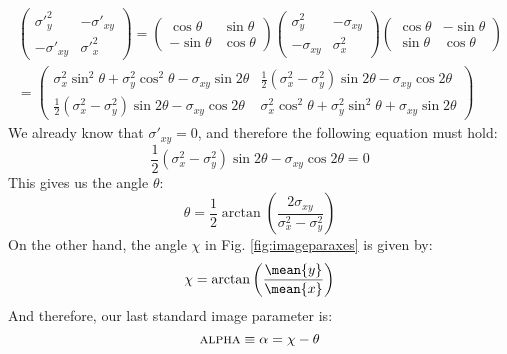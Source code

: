 \begin{multline}
  \label{eq:rotexplicit}
  \begin{pmatrix}
    {\sigma'}_y^2 & -{\sigma'}_{xy} \\ -{\sigma'}_{xy} & {\sigma'}_x^2
  \end{pmatrix}
  =
  \begin{pmatrix}
    \cos\theta & \sin\theta \\ -\sin\theta & \cos\theta
  \end{pmatrix}
  \begin{pmatrix}
    \sigma_y^2 & -\sigma_{xy} \\ -\sigma_{xy} & \sigma_x^2
  \end{pmatrix}
  \begin{pmatrix}
    \cos\theta & -\sin\theta \\ \sin\theta & \cos\theta
  \end{pmatrix} \\
  =
  \begin{pmatrix}
    \sigma_x^2 \sin^2\theta + \sigma_y^2 \cos^2\theta 
    - \sigma_{xy} \sin2\theta&
    \frac{1}{2}(\sigma_x^2 - \sigma_y^2)\sin2\theta  
    - \sigma_{xy}\cos2\theta \\
    \frac{1}{2}(\sigma_x^2 - \sigma_y^2)\sin2\theta 
    - \sigma_{xy}\cos2\theta &
    \sigma_x^2 \cos^2\theta + \sigma_y^2 \sin^2\theta 
    + \sigma_{xy} \sin2\theta
  \end{pmatrix}
\end{multline}
%
We already know that ${\sigma'}_{xy} = 0$, and therefore the following
equation must hold:
%
\begin{equation}
  \label{eq:sigmapxy}
  \frac{1}{2}(\sigma_x^2 - \sigma_y^2)\sin2\theta  
    - \sigma_{xy}\cos2\theta = 0
\end{equation}
%
This gives us the angle $\theta$:
%
\begin{equation}
  \label{eq:theta}
  \theta = \frac{1}{2} \arctan 
  \left(\frac{2\sigma_{xy}}{\sigma_x^2 - \sigma_y^2}\right)
\end{equation}
%
On the other hand, the angle $\chi$ in Fig. \ref{fig:imageparaxes} is
given by:
%
\begin{equation}
  \label{eq:chi}
  \chi = \arctan\left(\frac{\mean{y}}{\mean{x}}\right)
\end{equation}
%
And therefore, our last standard image parameter is:
%
\begin{equation}
  \label{eq:alpha}
  \text{\scshape alpha} \equiv \alpha = \chi - \theta
\end{equation}


